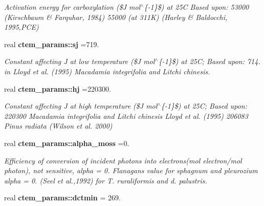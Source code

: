 \begin{DoxyCompactItemize}
\begin{DoxyCompactList}\small\item\em Activation energy for carboxylation (\$\+J mol$^\wedge$\{-\/1\}\$) at 25\+C Based upon\+: 53000 (Kirschbaum \& Farquhar, 1984) 55000 (at 311\+K) (Harley \& Baldocchi, 1995,P\+C\+E) \end{DoxyCompactList}\item 
\hypertarget{namespacectem__params_a1c43450205b241741e92f1803204cb74}{}real {\bfseries ctem\+\_\+params\+::sj} =719.\label{namespacectem__params_a1c43450205b241741e92f1803204cb74}

\begin{DoxyCompactList}\small\item\em Constant affecting J at low temperature (\$\+J mol$^\wedge$\{-\/1\}\$) at 25\+C; Based upon\+: 714. in Lloyd et al. (1995) Macadamia integrifolia and Litchi chinesis. \end{DoxyCompactList}\item 
\hypertarget{namespacectem__params_aa10d8d4d4da4b27eef7ae2430a8c7ae7}{}real {\bfseries ctem\+\_\+params\+::hj} =220300.\label{namespacectem__params_aa10d8d4d4da4b27eef7ae2430a8c7ae7}

\begin{DoxyCompactList}\small\item\em Constant affecting J at high temperature (\$\+J mol$^\wedge$\{-\/1\}\$) at 25\+C; Based upon\+: 220300 Macadamia integrifolia and Litchi chinesis Lloyd et al. (1995) 206083 Pinus radiata (Wilson et al. 2000) \end{DoxyCompactList}\item 
\hypertarget{namespacectem__params_ae90073ba7316ac9a569f0a8a97dd81d9}{}real {\bfseries ctem\+\_\+params\+::alpha\+\_\+moss} =0.\label{namespacectem__params_ae90073ba7316ac9a569f0a8a97dd81d9}

\begin{DoxyCompactList}\small\item\em Efficiency of conversion of incident photons into electrons(mol electron/mol photon), not sensitive, alpha = 0. Flanagan\textquotesingle{}s value for sphagnum and pleurozium alpha = 0. (Seel et al.,1992) for T. ruraliformis and d. palustris. \end{DoxyCompactList}\item 
\hypertarget{namespacectem__params_aa98fb2b4f1bd31eac28fcbb8ab6d8667}{}real {\bfseries ctem\+\_\+params\+::dctmin} = 269.\label{namespacectem__params_aa98fb2b4f1bd31eac28fcbb8ab6d8667}


\end{DoxyCompactItemize}

